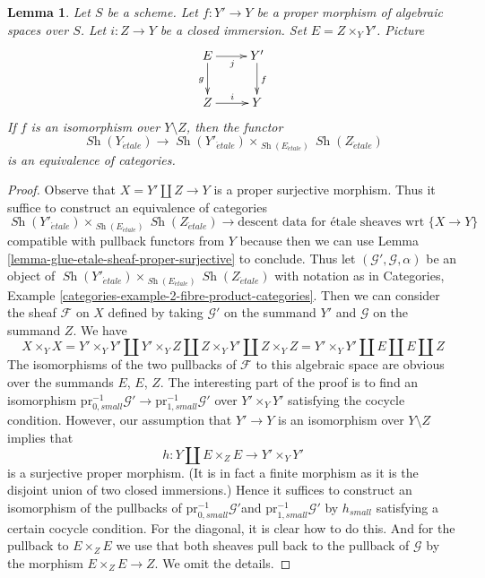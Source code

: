 \documentclass[10pt,a4paper]{amsart}
\theoremstyle{plain}
\newtheorem{lemma}[subsection]{Lemma}
\theoremstyle{definition}
\theoremstyle{remark}
\numberwithin{equation}{subsection}
\def\Sh{\mathop{\mathit{Sh}}\nolimits}
\def\etale{{\acute{e}tale}}
\begin{document}
\begin{lemma}
\label{lemma-glue-etale-sheaf-modification}
Let $S$ be a scheme. Let $f : Y' \to Y$ be a proper morphism of
algebraic spaces over $S$. Let $i : Z \to Y$
be a closed immersion. Set $E = Z \times_Y Y'$. Picture
$$
\xymatrix{
E \ar[d]_g \ar[r]_j & Y' \ar[d]^f \\
Z \ar[r]^i & Y
}
$$
If $f$ is an isomorphism over $Y \setminus Z$, then the functor
$$
\Sh(Y_\etale)
\longrightarrow
\Sh(Y'_\etale) \times_{\Sh(E_\etale)} \Sh(Z_\etale)
$$
is an equivalence of categories.
\end{lemma}

\begin{proof}
Observe that $X = Y' \coprod Z \to Y$ is a proper surjective morphism.
Thus it suffice to construct an equivalence of categories
$$
\Sh(Y'_\etale) \times_{\Sh(E_\etale)} \Sh(Z_\etale)
\longrightarrow
\text{descent data for \'etale sheaves wrt }\{X \to Y\}
$$
compatible with pullback functors from $Y$
because then we can use Lemma \ref{lemma-glue-etale-sheaf-proper-surjective}
to conclude. Thus let $(\mathcal{G}', \mathcal{G}, \alpha)$ be an
object of $\Sh(Y'_\etale) \times_{\Sh(E_\etale)} \Sh(Z_\etale)$ with
notation as in Categories, Example
\ref{categories-example-2-fibre-product-categories}.
Then we can consider the sheaf $\mathcal{F}$ on $X$ defined
by taking $\mathcal{G}'$ on the summand $Y'$ and $\mathcal{G}$
on the summand $Z$. We have
$$
X \times_Y X = Y' \times_Y Y' \amalg
Y' \times_Y Z \amalg Z \times_Y Y' \amalg Z \times_Y Z =
Y' \times_Y Y' \amalg E \amalg E \amalg Z
$$
The isomorphisms of the two pullbacks of $\mathcal{F}$ to this algebraic
space are obvious over the summands $E$, $E$, $Z$. The interesting
part of the proof is to find an isomorphism
$\text{pr}_{0, small}^{-1}\mathcal{G}' \to
\text{pr}_{1, small}^{-1}\mathcal{G}'$
over $Y' \times_Y Y'$ satisfying the cocycle condition.
However, our assumption that $Y' \to Y$ is an isomorphism
over $Y \setminus Z$ implies that
$$
h : Y \coprod E \times_Z E \longrightarrow Y' \times_Y Y'
$$
is a surjective proper morphism. (It is in fact a finite morphism
as it is the disjoint union of two closed immersions.)
Hence it suffices to construct an isomorphism of the pullbacks
of $\text{pr}_{0, small}^{-1}\mathcal{G}'$and
$\text{pr}_{1, small}^{-1}\mathcal{G}'$ by $h_{small}$ satisfying
a certain cocycle condition. For the diagonal, it is clear
how to do this. And for the pullback to $E \times_Z E$
we use that both sheaves pull back to the pullback of
$\mathcal{G}$ by the morphism $E \times_Z E \to Z$.
We omit the details.
\end{proof}
\end{document}
